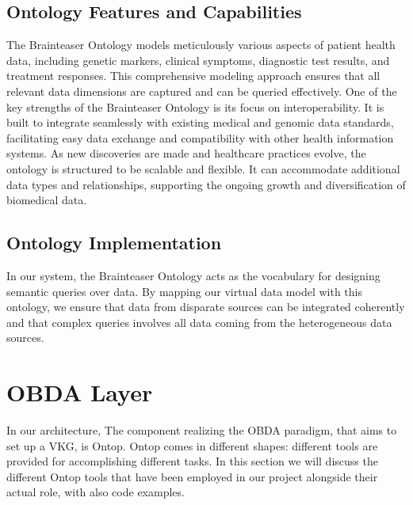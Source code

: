 \subsection{Ontology Features and Capabilities}
The Brainteaser Ontology models meticulously various aspects of patient health data, including genetic markers, clinical symptoms, diagnostic test results, and treatment responses. This comprehensive modeling approach ensures that all relevant data dimensions are captured and can be queried effectively. One of the key strengths of the Brainteaser Ontology is its focus on interoperability. It is built to integrate seamlessly with existing medical and genomic data standards, facilitating easy data exchange and compatibility with other health information systems. As new discoveries are made and healthcare practices evolve, the ontology is structured to be scalable and flexible. It can accommodate additional data types and relationships, supporting the ongoing growth and diversification of biomedical data.
\subsection{Ontology Implementation}
In our system, the Brainteaser Ontology acts as the vocabulary for designing semantic queries over data. By mapping our virtual data model with this ontology, we ensure that data from disparate sources can be integrated coherently and that complex queries involves all data coming from the heterogeneous data sources.

\section{OBDA Layer}
In our architecture, The component realizing the \ac{OBDA} paradigm, that aims to set up a \ac{VKG}, is Ontop.
Ontop comes in different shapes: different tools are provided for accomplishing different tasks.
In this section we will discuss the different Ontop tools that have been employed in our project alongside their actual role, with also code examples.
